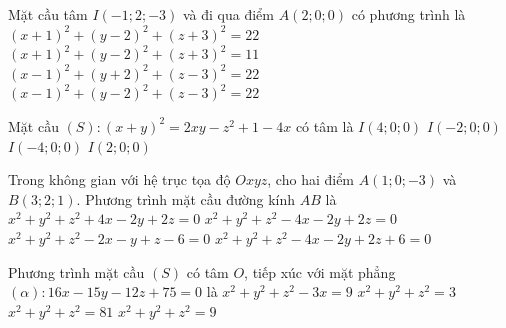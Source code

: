 \begin{ex}%
Mặt cầu tâm $I\left(-1;2;-3 \right)$ và đi qua điểm $A\left(2;0;0 \right)$ có phương trình là
\choice
	{\True $\left(x+1 \right)^2+\left(y-2 \right)^2+\left(z+3 \right)^2=22$}
	{$\left(x+1 \right)^2+\left(y-2 \right)^2+\left(z+3 \right)^2=11$}
	{$\left(x-1 \right)^2+\left(y+2 \right)^2+\left(z-3 \right)^2=22$}
	{$\left(x-1 \right)^2+\left(y-2 \right)^2+\left(z-3 \right)^2=22$}
\end{ex}
\begin{ex}%
Mặt cầu $\left(S \right):\left(x+y \right)^2=2xy-z^2+1-4x$ có tâm là
\choice
	{$I\left(4;0;0\right)$}
	{\True $I\left(-2;0;0\right)$}
	{$I\left(-4;0;0\right)$}
	{$I\left(2;0;0\right)$}
\end{ex}
\begin{ex}%
Trong không gian với hệ trục tọa độ $Oxyz$, cho hai điểm $A\left(1;0;-3 \right)$ và $B\left(3;2;1 \right)$. Phương trình mặt cầu đường kính $AB$ là
\choice
	{$x^2+y^2+z^2+4x-2y+2z=0$}
	{\True $x^2+y^2+z^2-4x-2y+2z=0$}
	{$x^2+y^2+z^2-2x-y+z-6=0$}
	{$x^2+y^2+z^2-4x-2y+2z+6=0$}
\end{ex}
\begin{ex}%
Phương trình mặt cầu $\left(S \right)$ có tâm $O$, tiếp xúc với mặt phẳng $\left(\alpha\right):16x-15y-12z+75=0$ là
\choice
	{$x^2+y^2+z^2-3x=9$}
	{$x^2+y^2+z^2=3$}
	{$x^2+y^2+z^2=81$}
	{\True $x^2+y^2+z^2=9$}
\end{ex}
